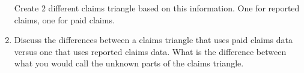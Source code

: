\documentclass{article}
\begin{document}
\begin{enumerate}
Create 2 different claims triangle based on this information. One for reported claims, one for paid claims. 


\item Discuss the differences between a claims triangle that uses paid claims data versus one that uses reported claims data. What is the difference between what you would call the unknown parts of the claims triangle. 

\end{enumerate}
\end{document}
